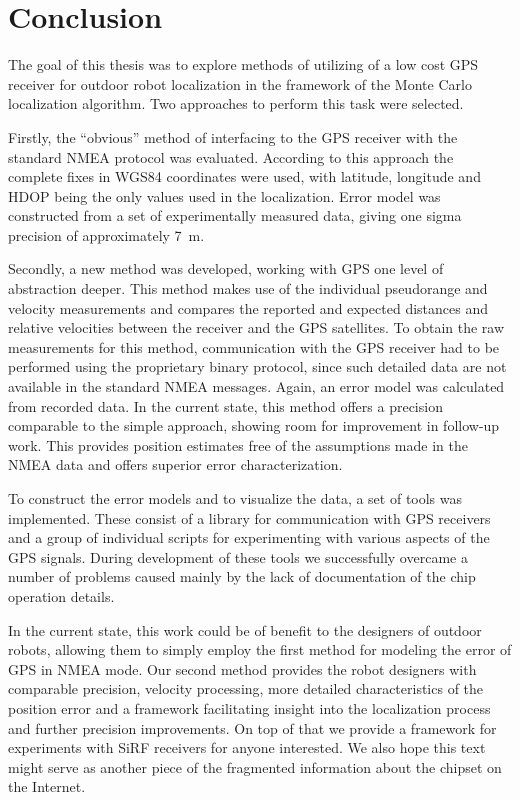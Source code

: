 \chapter{Conclusion}
\label{chap:conclusion}

The goal of this thesis was to explore methods of utilizing of a low cost GPS receiver
for outdoor robot localization in the framework of the Monte Carlo localization algorithm.
Two approaches to perform this task were selected.

Firstly, the \enquote{obvious} method of interfacing to the GPS receiver with the
standard NMEA protocol was evaluated.
According to this approach the complete fixes in WGS84 coordinates were used,
with latitude, longitude and HDOP being the only values used in the localization.
Error model was constructed from a set of experimentally measured data,
giving one sigma precision of approximately \SI{7}{\meter}.

Secondly, a new method was developed, working with GPS one level of abstraction deeper.
This method makes use of the individual pseudorange and velocity measurements
and compares the reported and expected distances and relative velocities between
the receiver and the GPS satellites.
To obtain the raw measurements for this method, communication with the GPS
receiver had to be performed using the proprietary binary protocol,
since such detailed data are not available in the standard NMEA messages.
Again, an error model was calculated from recorded data.
In the current state, this method offers a precision comparable to the simple
approach, showing room for improvement in follow-up work.
This provides position estimates free of the assumptions made in the NMEA data
and offers superior error characterization.

To construct the error models and to visualize the data, a set of tools was implemented.
These consist of a library for communication with \sirf GPS receivers
and a group of individual scripts for experimenting with various aspects of the GPS signals.
During development of these tools we successfully overcame a number of problems caused mainly
by the lack of documentation of the \sirf chip operation details.

In the current state, this work could be of benefit to the designers of
outdoor robots, allowing them to simply employ the first method for modeling the
error of GPS in NMEA mode.
Our second method provides the robot designers with comparable precision,
velocity processing, more detailed characteristics of the position error
and a framework facilitating insight into the localization process and further
precision improvements.
On top of that we provide a framework for experiments with SiRF receivers
for anyone interested.
We also hope this text might serve as another piece of the fragmented
information about the \sirf chipset on the Internet.

